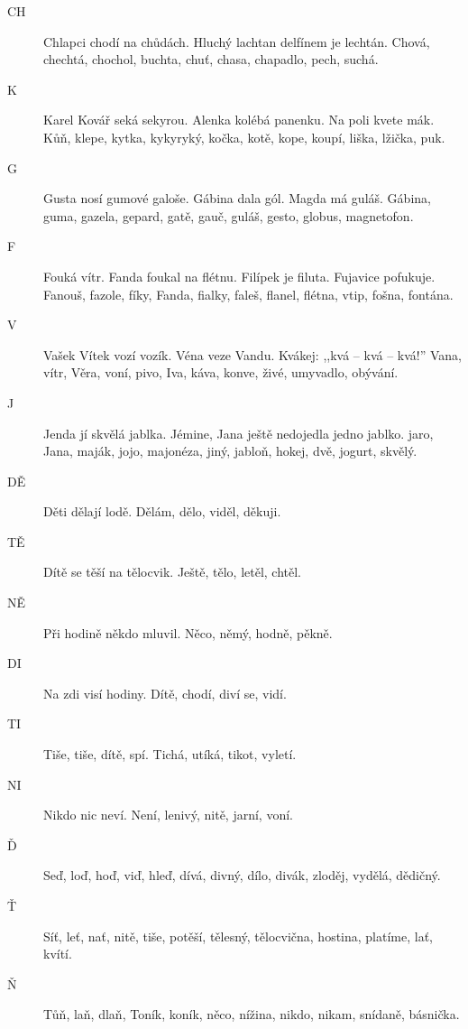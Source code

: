 \begin{multicols}{2}
\begin{description}
\item[CH] Chlapci chodí na chůdách. Hluchý lachtan delfínem je lechtán.
Chová, chechtá, chochol, buchta, chuť, chasa, chapadlo, pech, suchá.

\item[K] Karel Kovář seká sekyrou. Alenka kolébá panenku. Na poli kvete 
mák. Kůň, klepe, kytka, kykyryký, kočka, kotě, kope, koupí, liška,
lžička, puk.

\item[G] Gusta nosí gumové galoše. Gábina dala gól. Magda má guláš.
Gábina, guma, gazela, gepard, gatě, gauč, guláš, gesto, globus, magnetofon.

\item[F] Fouká vítr. Fanda foukal na flétnu. Filípek je filuta. Fujavice 
pofukuje. Fanouš, fazole, fíky, Fanda, fialky, faleš, flanel, flétna, vtip, 
fošna, fontána.

\item[V] Vašek Vítek vozí vozík. Véna veze Vandu. Kvákej: ,,kvá -- kvá 
-- kvá!'' Vana, vítr, Věra, voní, pivo, Iva, káva, konve, živé, umyvadlo, obývání.

\item[J] Jenda jí skvělá jablka. Jémine, Jana ještě nedojedla jedno jablko.
jaro, Jana, maják, jojo, majonéza, jiný, jabloň, hokej, dvě, jogurt, skvělý.

\item[DĚ] Děti dělají lodě. Dělám, dělo, viděl, děkuji.

\item[TĚ] Dítě se těší na tělocvik. Ještě, tělo, letěl, chtěl.

\item[NĚ] Při hodině někdo mluvil. Něco, němý, hodně, pěkně.

\item[DI] Na zdi visí hodiny. Dítě, chodí, diví se, vidí.

\item[TI] Tiše, tiše, dítě, spí. Tichá, utíká, tikot, vyletí.

\item[NI] Nikdo nic neví. Není, lenivý, nitě, jarní, voní.

\item[Ď] Seď, loď, hoď, viď, hleď, dívá, divný, dílo, divák, zloděj, 
vydělá, dědičný.

\item[Ť] Síť, leť, nať, nitě, tiše, potěší, tělesný, tělocvična, hostina, 
platíme, lať, kvítí.

\item[Ň] Tůň, laň, dlaň, Toník, koník, něco, nížina, nikdo, nikam, snídaně, 
básnička.

\end{description}

\end{multicols}
\clearpage

